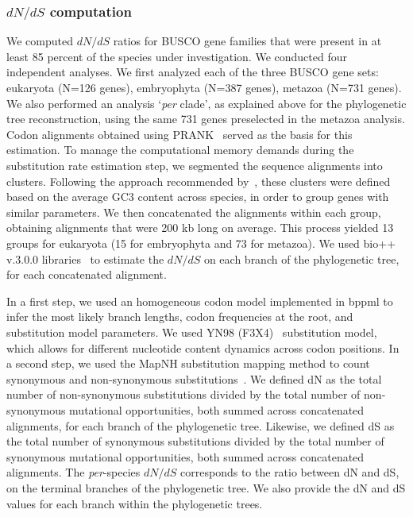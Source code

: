 \subsubsection{${dN}/{dS}$ computation}
We computed ${dN}/{dS}$ ratios for \acrshort{BUSCO} gene families that were present in at least 85 percent of the species under investigation. We conducted four independent analyses. We first analyzed each of the three \acrshort{BUSCO} gene sets: eukaryota (N=126 genes), embryophyta (N=387 genes), metazoa (N=731 genes). We also performed an analysis `\textit{per} clade', as explained above for the phylogenetic tree reconstruction, using the same 731 genes preselected in the metazoa analysis. Codon alignments obtained using PRANK~\citep{loytynoja_phylogeny-aware_2008} served as the basis for this estimation. To manage the computational memory demands during the substitution rate estimation step, we segmented the sequence alignments into clusters. Following the approach recommended by~\citet{bolivar_gc-biased_2019}, these clusters were defined based on the average \acrshort{GC3} content across species, in order to group genes with similar parameters. We then concatenated the alignments within each group, obtaining alignments that were 200 \acrshort{kb} long on average. This process yielded 13 groups for eukaryota (15 for embryophyta and 73 for metazoa).
We used bio++ v.3.0.0 libraries~\citep{dutheil_non-homogeneous_2008, gueguen_bio_2013, bolivar_gc-biased_2019} to estimate the ${dN}/{dS}$ on each branch of the phylogenetic tree, for each concatenated alignment.

In a first step, we used an homogeneous codon model implemented in bppml to infer the most likely branch lengths, codon frequencies at the root, and substitution model parameters. We used YN98 (F3X4)~\citep{yang_synonymous_1998} substitution model, which allows for different nucleotide content dynamics across codon positions. In a second step, we used the MapNH substitution mapping method to count synonymous and non-synonymous substitutions~\citep{dutheil_efficient_2012, gueguen_unbiased_2018}. 
We defined dN as the total number of non-synonymous substitutions divided by the total number of non-synonymous mutational opportunities, both summed across concatenated alignments, for each branch of the phylogenetic tree. Likewise, we defined dS as the total number of synonymous substitutions divided by the total number of synonymous mutational opportunities, both summed across concatenated alignments. The \textit{per}-species ${dN}/{dS}$ corresponds to the ratio between dN and dS, on the terminal branches of the phylogenetic tree. We also provide the dN and dS values for each branch within the phylogenetic trees.

